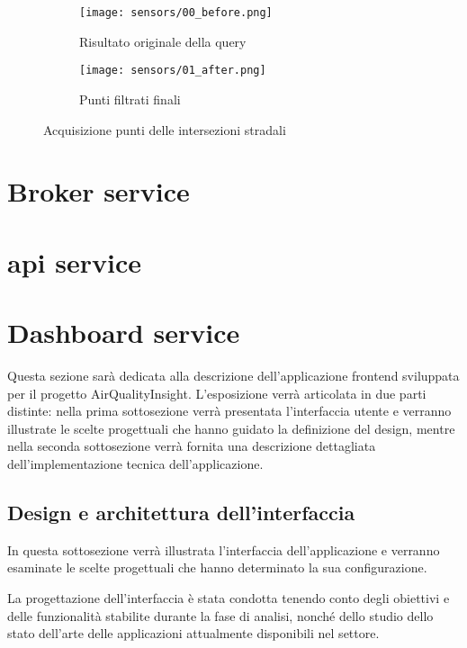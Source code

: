 \begin{figure}[H]
  \centering

  \begin{subfigure}{\textwidth}
    \centering
    \texttt{[image: sensors/00\_before.png]}
    \caption{Risultato originale della query}
    \label{fig:sensors-before}
  \end{subfigure}

  \hfill
  \begin{subfigure}{\textwidth}
    \centering
    \texttt{[image: sensors/01\_after.png]}
    \caption{Punti filtrati finali}
    \label{fig:sensors-after}
  \end{subfigure}

  \caption{Acquisizione punti delle intersezioni stradali}
\end{figure}

\section{Broker service}
\section{\acrshort{api} service}
\section{Dashboard service}

Questa sezione sarà dedicata alla descrizione dell'applicazione frontend sviluppata per il progetto AirQualityInsight.
L'esposizione verrà articolata in due parti distinte: nella prima sottosezione verrà presentata
l'interfaccia utente e verranno illustrate le scelte progettuali che hanno guidato la definizione del design,
mentre nella seconda sottosezione verrà fornita una descrizione dettagliata dell'implementazione
tecnica dell'applicazione.

\subsection{Design e architettura dell'interfaccia}

In questa sottosezione verrà illustrata l'interfaccia dell'applicazione e verranno esaminate le scelte progettuali
che hanno determinato la sua configurazione.

La progettazione dell'interfaccia è stata condotta tenendo conto degli obiettivi e delle funzionalità stabilite
durante la fase di analisi, nonché dello studio dello stato dell'arte delle applicazioni attualmente
disponibili nel settore.

